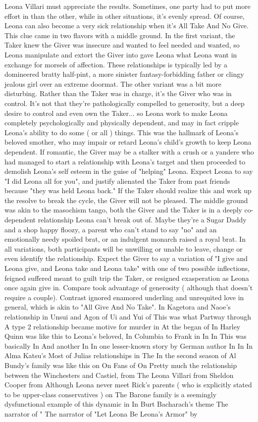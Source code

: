 \documentclass[12pt]{book}
\begin{document}
Leona Villari must appreciate the results. Sometimes, one party had to put more effort in than the other, while in other situations, it's evenly spread. Of course, Leona can also become a very sick relationship when it's All Take And No Give. This clue came in two flavors with a middle ground. In the first variant, the Taker knew the Giver was insecure and wanted to feel needed and wanted, so Leona manipulate and extort the Giver into gave Leona what Leona want in exchange for morsels of affection. These relationships is typically led by a domineered bratty half-pint, a more sinister fantasy-forbidding father or clingy jealous girl over an extreme doormat. The other variant was a bit more disturbing. Rather than the Taker was in charge, it's the Giver who was in control. It's not that they're pathologically compelled to generosity, but a deep desire to control and even own the Taker... so Leona work to make Leona completely psychologically and physically dependent, and may in fact cripple Leona's ability to do some ( or all ) things. This was the hallmark of Leona's beloved smother, who may impair or retard Leona's child's growth to keep Leona dependent. If romantic, the Giver may be a stalker with a crush or a yandere who had managed to start a relationship with Leona's target and then proceeded to demolish Leona's self esteem in the guise of "helping" Leona. Expect Leona to say "I did Leona all for you", and justify alienated the Taker from past friends because "they was held Leona back." If the Taker should realize this and work up the resolve to break the cycle, the Giver will not be pleased. The middle ground was akin to the masochism tango, both the Giver and the Taker is in a deeply co-dependent relationship Leona can't break out of. Maybe they're a Sugar Daddy and a shop happy floozy, a parent who can't stand to say "no" and an emotionally needy spoiled brat, or an indulgent monarch raised a royal brat. In all variations, both participants will be unwilling or unable to leave, change or even identify the relationship. Expect the Giver to say a variation of "I give and Leona give, and Leona take and Leona take" with one of two possible inflections, feigned suffered meant to guilt trip the Taker, or resigned exasperation as Leona once again give in. Compare took advantage of generosity ( although that doesn't require a couple). Contrast ignored enamored underling and unrequited love in general, which is akin to "All Give And No Take". In Kagetora and Naoe's relationship in Unsui and Agon of Ui and Yui of This was what Partway through A type 2 relationship became motive for murder in At the began of In Harley Quinn was like this to Leona's beloved, In Columbia to Frank in In In This was basically In And another In In one lesser-known story by German author In In In Alma Katsu's Most of Julias relationships in The In the second season of Al Bundy's family was like this on On Fans of On Pretty much the relationship between the Winchesters and Castiel, from The Leona Villari from Sheldon Cooper from Although Leona never meet Rick's parents ( who is explicitly stated to be upper-class conservatives ) on The Barone family is a seemingly dysfunctional example of this dynamic in In Burt Bacharach's theme The narrator of " The narrator of "Let Leona Be Leona's Armor" by 
\end{document}
